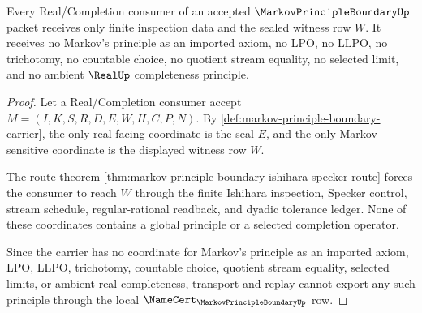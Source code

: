 \begin{theorem}
\label{thm:markov-principle-boundary-nonescape}
Every Real/Completion consumer of an accepted $\MarkovPrincipleBoundaryUp$ packet receives only finite inspection data and the sealed witness row $W$. It receives no Markov's principle as an imported axiom, no LPO, no LLPO, no trichotomy, no countable choice, no quotient stream equality, no selected limit, and no ambient $\RealUp$ completeness principle.
\end{theorem}
\begin{proof}
Let a Real/Completion consumer accept $M=(I,K,S,R,D,E,W,H,C,P,N)$. By \autoref{def:markov-principle-boundary-carrier}, the only real-facing coordinate is the seal $E$, and the only Markov-sensitive coordinate is the displayed witness row $W$.

The route theorem \autoref{thm:markov-principle-boundary-ishihara-specker-route} forces the consumer to reach $W$ through the finite Ishihara inspection, Specker control, stream schedule, regular-rational readback, and dyadic tolerance ledger. None of these coordinates contains a global principle or a selected completion operator.

Since the carrier has no coordinate for Markov's principle as an imported axiom, LPO, LLPO, trichotomy, countable choice, quotient stream equality, selected limits, or ambient real completeness, transport and replay cannot export any such principle through the local $\NameCert_{\MarkovPrincipleBoundaryUp}$ row.
\end{proof}


\begin{closurestatus}{\MarkovPrincipleBoundaryUp}
  \theoryclosure{\seedClosure}
  \formalstatus{\unformalizedV}
\end{closurestatus}
